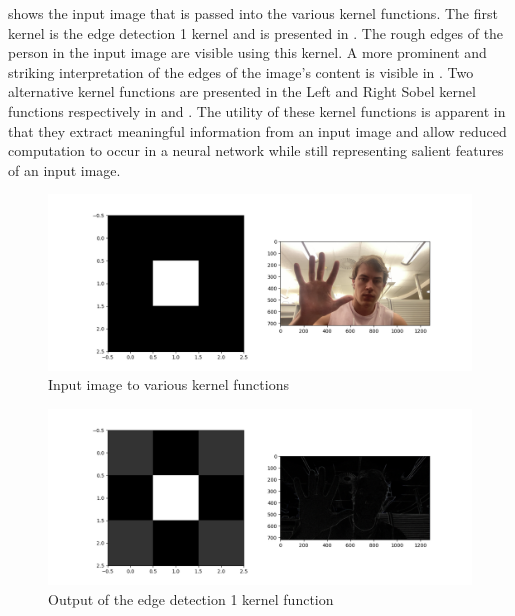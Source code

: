  shows the input image that is passed into the various kernel functions. The first kernel is the edge detection 1 kernel and is presented in . The rough edges of the person in the input image are visible using this kernel. A more prominent and striking interpretation of the edges of the image's content is visible in . Two alternative kernel functions are presented in the Left and Right Sobel kernel functions respectively in  and . The utility of these kernel functions is apparent in that they extract meaningful information from an input image and allow reduced computation to occur in a neural network while still representing salient features of an input image.

\begin{figure}[h]
    \centering
    \includegraphics[width=0.9\linewidth]{figures/kernel_identity.png}
    \caption{Input image to various kernel functions}
    \label{fig:kernel_identity}
\end{figure}

\begin{figure}[h]
    \centering
    \includegraphics[width=0.9\linewidth]{figures/kernel_edge_detection_1.png}
    \caption{Output of the edge detection 1 kernel function}
    \label{fig:kernel_edge_detection_1}
\end{figure}

